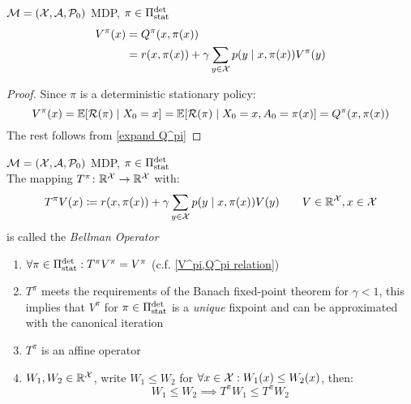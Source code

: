 \begin{corollary}\label{V^pi,Q^pi relation}  \(\mathcal{M}=(\mathcal{X},\mathcal{A},\mathcal{P}_0)\) MDP, \(\pi\in\Pi_{\textnormal{stat}}^{\textnormal{det}}\) 
\begin{align*}
	V^\pi(x)&=Q^\pi(x,\pi(x))\\
	 &=r(x,\pi(x))+\gamma\sum\limits_{y\in\mathcal{X}}p(y\mid x,\pi(x))V^\pi(y) 
\end{align*}
\end{corollary}

\begin{proof}
Since \(\pi\) is a deterministic stationary policy:
\[V^\pi(x)=\mathbb{E}[\mathcal{R}(\pi)\mid X_0=x]=\mathbb{E}[\mathcal{R}(\pi)\mid X_0=x, A_0=\pi(x)]=Q^\pi(x,\pi(x))\]
The rest follows from \ref{expand Q^pi}
\end{proof}

\begin{definition}\(\mathcal{M}=(\mathcal{X},\mathcal{A},\mathcal{P}_0)\) MDP, \(\pi\in\Pi_{\textnormal{stat}}^{\textnormal{det}}\) \\
The mapping \(T^\pi\colon\mathbb{R}^{\mathcal{X}}\to\mathbb{R}^{\mathcal{X}}\) with:
	\[
	T^\pi V(x)\coloneqq r(x,\pi(x))+\gamma\sum_{y\in\mathcal{X}}p(y\mid x,\pi(x)) V(y)\qquad V\in\mathbb{R}^{\mathcal{X}}, x\in\mathcal{X}
	\]
is called the \emph{Bellman Operator}
\end{definition}


\begin{remark}\label{properties T^pi}\leavevmode
	\begin{enumerate}[label=\arabic*.]
	\item \(\forall\pi\in\Pi_{\textnormal{stat}}^{\textnormal{det}} : T^\pi V^\pi=V^\pi\) (c.f. \ref{V^pi,Q^pi relation})
	\item\label{num:2} \(T^\pi\) meets the requirements of the Banach fixed-point theorem for \({\gamma<1}\), this implies that \(V^\pi\) for \(\pi\in\Pi_{\textnormal{stat}}^{\textnormal{det}}\)
	is a \emph{unique} fixpoint and can be approximated with the canonical iteration
	\item \(T^\pi\) is an affine operator
	\item\label{num:4} \(W_1,W_2\in\mathbb{R}^{\mathcal{X}}\), write \(W_1 \le W_2\) for \(\forall x\in\mathcal{X}:W_1(x)\le W_2(x)\), then:
	\[W_1\le W_2 \implies T^\pi W_1\le T^\pi W_2\]
	\end{enumerate}
\end{remark}

